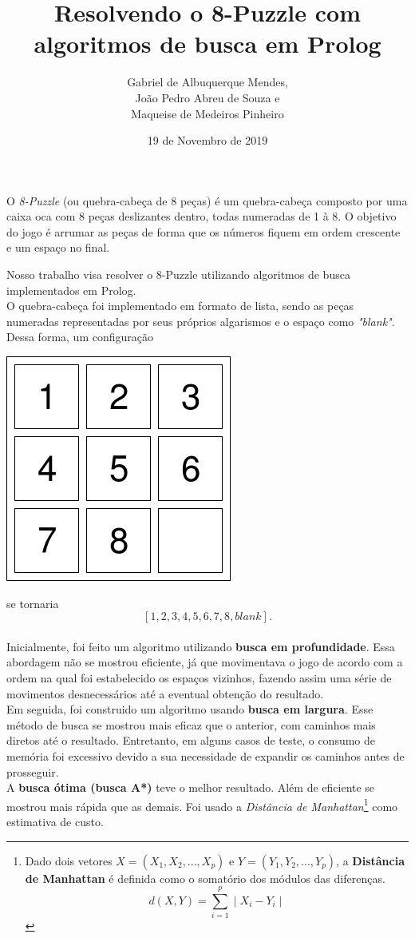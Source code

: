 \documentclass[12pt,a4paper]{article}
\author{Gabriel de Albuquerque Mendes,\\
 João Pedro Abreu de Souza e \\
 Maqueise de Medeiros Pinheiro}
\title{Resolvendo o 8-Puzzle com algoritmos de busca em Prolog}
\date{19 de Novembro de 2019}
\begin{document}
\maketitle
O \textit{8-Puzzle} (ou quebra-cabeça de 8 peças) é um quebra-cabeça composto por uma caixa oca com 8 peças deslizantes dentro, todas numeradas de 1 à 8. O objetivo do jogo é arrumar as peças de forma que os números fiquem em ordem crescente e um espaço no final.

Nosso trabalho visa resolver o 8-Puzzle utilizando algoritmos de busca implementados em Prolog.
\\

O quebra-cabeça foi implementado em formato de lista, sendo as peças numeradas representadas por seus próprios algarismos e o espaço como \textit{"blank"}. Dessa forma, um configuração
\begin{center}
\includegraphics[scale=0.5]{8puzzle.png} 
\end{center} 
se tornaria $$[1,2,3,4,5,6,7,8,blank].$$
\\

Inicialmente, foi feito um algoritmo utilizando \textbf{busca em profundidade}. Essa abordagem não se mostrou eficiente, já que movimentava o jogo de acordo com a ordem na qual foi estabelecido os espaços vizinhos, fazendo assim uma série de movimentos desnecessários até a eventual obtenção do resultado.
\\

Em seguida, foi construido um algoritmo usando \textbf{busca em largura}. Esse método de busca se mostrou mais eficaz que o anterior, com caminhos mais diretos até o resultado. Entretanto, em alguns casos de teste, o consumo de memória foi excessivo devido a sua necessidade de expandir os caminhos antes de prosseguir.
\\

A \textbf{busca ótima (busca A*)} teve o melhor resultado. Além de eficiente se mostrou mais rápida que as demais. Foi usado a \textit{Distância de Manhattan}\footnote{Dado dois vetores $X=(X_1,X_2,...,X_p)$ e $Y=(Y_1,Y_2,...,Y_p)$, a \textbf{Distância de Manhattan} é definida como o somatório dos módulos das diferenças. $$d(X,Y)= \sum_{i=1}^{p} \mid X_i - Y_i \mid$$} como estimativa de custo.
\end{document}
